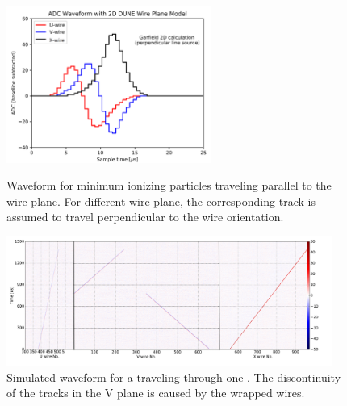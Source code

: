 \begin{figure}[htbp]
  \centering
        \includegraphics[width=0.6\textwidth]{graphics/DUNE_line_source_wf.png}
        \caption{Waveform for minimum ionizing particles traveling parallel to the wire plane. For different
        wire plane, the corresponding track is assumed to travel perpendicular to the wire orientation. 
        }\label{fig:simevent_wf}
         \includegraphics[width=0.95\textwidth]{graphics/track_sim.png}
    \caption{Simulated waveform for a  traveling through one . The discontinuity of the 
    tracks in the V plane is caused by the wrapped wires.}
  \label{fig:simevent}
\end{figure}

